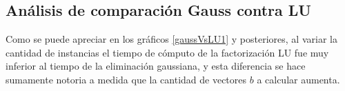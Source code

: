 \subsection{Análisis de comparación Gauss contra LU}
Como se puede apreciar en los gráficos \ref{gaussVsLU1} y posteriores, al variar la cantidad de instancias el tiempo de cómputo de la factorización LU fue muy inferior al tiempo de la eliminación gaussiana, y esta diferencia se hace sumamente notoria a medida que la cantidad de vectores $b$ a calcular aumenta.
